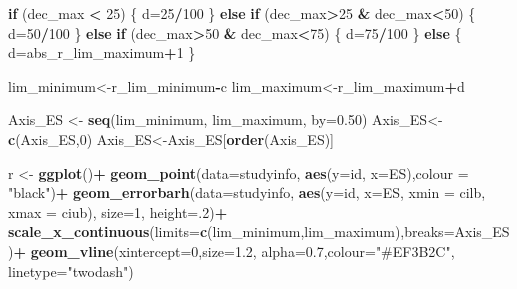 \documentclass[
]{book}
\newenvironment{Shaded}{\begin{snugshade}}{\end{snugshade}}
\newcommand{\AttributeTok}[1]{\textcolor[rgb]{0.13,0.29,0.53}{#1}}
\newcommand{\ControlFlowTok}[1]{\textcolor[rgb]{0.13,0.29,0.53}{\textbf{#1}}}
\newcommand{\DecValTok}[1]{\textcolor[rgb]{0.00,0.00,0.81}{#1}}
\newcommand{\FloatTok}[1]{\textcolor[rgb]{0.00,0.00,0.81}{#1}}
\newcommand{\FunctionTok}[1]{\textcolor[rgb]{0.13,0.29,0.53}{\textbf{#1}}}
\newcommand{\NormalTok}[1]{#1}
\newcommand{\OtherTok}[1]{\textcolor[rgb]{0.56,0.35,0.01}{#1}}
\newcommand{\SpecialCharTok}[1]{\textcolor[rgb]{0.81,0.36,0.00}{\textbf{#1}}}
\newcommand{\StringTok}[1]{\textcolor[rgb]{0.31,0.60,0.02}{#1}}
\begin{document}
\begin{Shaded}
\begin{Highlighting}[]
  \ControlFlowTok{if}\NormalTok{ (dec\_max }\SpecialCharTok{\textless{}} \DecValTok{25}\NormalTok{) \{}
\NormalTok{    d}\OtherTok{=}\DecValTok{25}\SpecialCharTok{/}\DecValTok{100}
\NormalTok{  \} }\ControlFlowTok{else} \ControlFlowTok{if}\NormalTok{ (dec\_max}\SpecialCharTok{\textgreater{}}\DecValTok{25} \SpecialCharTok{\&}\NormalTok{ dec\_max}\SpecialCharTok{\textless{}}\DecValTok{50}\NormalTok{) \{}
\NormalTok{    d}\OtherTok{=}\DecValTok{50}\SpecialCharTok{/}\DecValTok{100}
\NormalTok{  \} }\ControlFlowTok{else} \ControlFlowTok{if}\NormalTok{ (dec\_max}\SpecialCharTok{\textgreater{}}\DecValTok{50} \SpecialCharTok{\&}\NormalTok{ dec\_max}\SpecialCharTok{\textless{}}\DecValTok{75}\NormalTok{) \{}
\NormalTok{    d}\OtherTok{=}\DecValTok{75}\SpecialCharTok{/}\DecValTok{100}
\NormalTok{  \} }\ControlFlowTok{else}\NormalTok{ \{}
\NormalTok{    d}\OtherTok{=}\NormalTok{abs\_r\_lim\_maximum}\SpecialCharTok{+}\DecValTok{1}
\NormalTok{  \}}
  
\NormalTok{  lim\_minimum}\OtherTok{\textless{}{-}}\NormalTok{r\_lim\_minimum}\SpecialCharTok{{-}}\NormalTok{c}
\NormalTok{  lim\_maximum}\OtherTok{\textless{}{-}}\NormalTok{r\_lim\_maximum}\SpecialCharTok{+}\NormalTok{d}
  
\NormalTok{  Axis\_ES }\OtherTok{\textless{}{-}} \FunctionTok{seq}\NormalTok{(lim\_minimum, lim\_maximum, }\AttributeTok{by=}\FloatTok{0.50}\NormalTok{)}
\NormalTok{  Axis\_ES}\OtherTok{\textless{}{-}} \FunctionTok{c}\NormalTok{(Axis\_ES,}\DecValTok{0}\NormalTok{)}
\NormalTok{  Axis\_ES}\OtherTok{\textless{}{-}}\NormalTok{Axis\_ES[}\FunctionTok{order}\NormalTok{(Axis\_ES)]}
  
  
\NormalTok{  r }\OtherTok{\textless{}{-}} \FunctionTok{ggplot}\NormalTok{()}\SpecialCharTok{+}
    \FunctionTok{geom\_point}\NormalTok{(}\AttributeTok{data=}\NormalTok{studyinfo, }\FunctionTok{aes}\NormalTok{(}\AttributeTok{y=}\NormalTok{id, }\AttributeTok{x=}\NormalTok{ES),}\AttributeTok{colour =} \StringTok{"black"}\NormalTok{)}\SpecialCharTok{+}
    \FunctionTok{geom\_errorbarh}\NormalTok{(}\AttributeTok{data=}\NormalTok{studyinfo, }\FunctionTok{aes}\NormalTok{(}\AttributeTok{y=}\NormalTok{id, }\AttributeTok{x=}\NormalTok{ES, }\AttributeTok{xmin =}\NormalTok{ cilb, }\AttributeTok{xmax =}\NormalTok{ ciub),  }\AttributeTok{size=}\DecValTok{1}\NormalTok{, }\AttributeTok{height=}\NormalTok{.}\DecValTok{2}\NormalTok{)}\SpecialCharTok{+}
    \FunctionTok{scale\_x\_continuous}\NormalTok{(}\AttributeTok{limits=}\FunctionTok{c}\NormalTok{(lim\_minimum,lim\_maximum),}\AttributeTok{breaks=}\NormalTok{Axis\_ES)}\SpecialCharTok{+} 
    \FunctionTok{geom\_vline}\NormalTok{(}\AttributeTok{xintercept=}\DecValTok{0}\NormalTok{,}\AttributeTok{size=}\FloatTok{1.2}\NormalTok{, }\AttributeTok{alpha=}\FloatTok{0.7}\NormalTok{,}\AttributeTok{colour=}\StringTok{"\#EF3B2C"}\NormalTok{, }\AttributeTok{linetype=}\StringTok{"twodash"}\NormalTok{)}
  

\end{Highlighting}
\end{Shaded}
\end{document}
